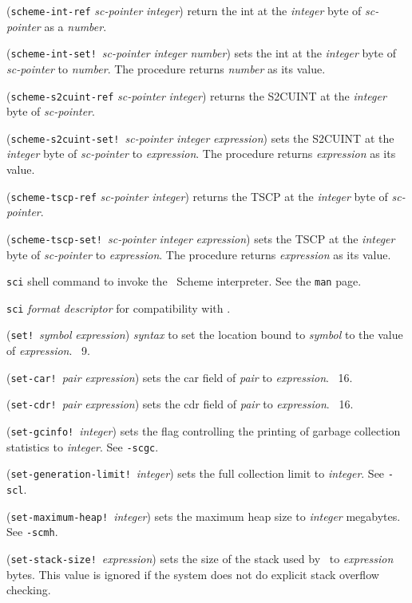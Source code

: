 \documentclass[10pt,twocolumn]{article}
\begin{document}
(\texttt{scheme-int-ref} \emph{sc-pointer} \emph{integer}) return the
int at the \emph{integer} byte of \emph{sc-pointer} as a
\emph{number}.

(\texttt{scheme-int-set!}\ \emph{sc-pointer} \emph{integer}
\emph{number}) sets the int at the \emph{integer} byte of
\emph{sc-pointer} to \emph{number}.  The procedure returns
\emph{number} as its value.

(\texttt{scheme-s2cuint-ref} \emph{sc-pointer} \emph{integer}) returns
the S2CUINT at the \emph{integer} byte of \emph{sc-pointer}.

(\texttt{scheme-s2cuint-set!}\ \emph{sc-pointer} \emph{integer}
\emph{expression}) sets the S2CUINT at the \emph{integer} byte of
\emph{sc-pointer} to \emph{expression}.  The procedure returns
\emph{expression} as its value.

(\texttt{scheme-tscp-ref} \emph{sc-pointer} \emph{integer}) returns
the TSCP at the \emph{integer} byte of \emph{sc-pointer}.

(\texttt{scheme-tscp-set!}\ \emph{sc-pointer} \emph{integer}
\emph{expression}) sets the TSCP at the \emph{integer} byte of
\emph{sc-pointer} to \emph{expression}.  The procedure returns
\emph{expression} as its value.

\texttt{sci} shell command to invoke the \StoC\ Scheme interpreter.
See the \texttt{man} page.

\texttt{sci} \emph{format descriptor} for compatibility with \RRRRS.

(\texttt{set!}\ \emph{symbol} \emph{expression}) \emph{syntax} to set
the location bound to \emph{symbol} to the value of \emph{expression}.
\RRRRRS~9.

(\texttt{set-car!}\ \emph{pair} \emph{expression}) sets the car field
of \emph{pair} to \emph{expression}.  \RRRRRS~16.

(\texttt{set-cdr!}\ \emph{pair} \emph{expression}) sets the cdr field
of \emph{pair} to \emph{expression}.  \RRRRRS~16.

(\texttt{set-gcinfo!}\ \emph{integer}) sets the flag controlling the
printing of garbage collection statistics to \emph{integer}.  See
\texttt{-scgc}.

(\texttt{set-generation-limit!}\ \emph{integer}) sets the full
collection limit to \emph{integer}.  See \texttt{-scl}.

(\texttt{set-maximum-heap!}\ \emph{integer}) sets the maximum heap
size to \emph{integer} megabytes.  See \texttt{-scmh}.

(\texttt{set-stack-size!}\ \emph{expression}) sets the size of the
stack used by \StoC\ to \emph{expression} bytes.  This value is
ignored if the system does not do explicit stack overflow checking.
\end{document}
